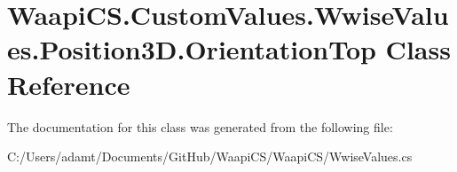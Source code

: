 \hypertarget{class_waapi_c_s_1_1_custom_values_1_1_wwise_values_1_1_position3_d_1_1_orientation_top}{}\section{Waapi\+C\+S.\+Custom\+Values.\+Wwise\+Values.\+Position3\+D.\+Orientation\+Top Class Reference}
\label{class_waapi_c_s_1_1_custom_values_1_1_wwise_values_1_1_position3_d_1_1_orientation_top}


The documentation for this class was generated from the following file\+:\begin{DoxyCompactItemize}
\item 
C\+:/\+Users/adamt/\+Documents/\+Git\+Hub/\+Waapi\+C\+S/\+Waapi\+C\+S/Wwise\+Values.\+cs\end{DoxyCompactItemize}

